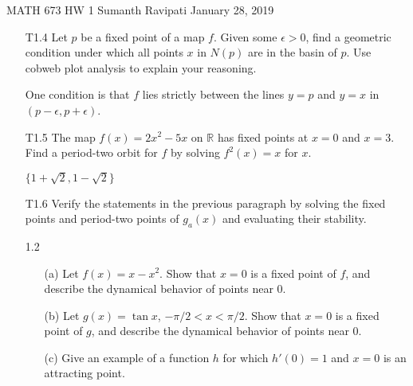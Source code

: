 \documentclass[12pt,letterpaper,reqno]{amsart}
\newcommand{\R}{\mathbb R}
\begin{document}
\thispagestyle{empty}
\begin{center}\large{
    MATH 673\quad
    HW 1\quad
    Sumanth Ravipati\quad
    January 28, 2019}
\end{center}
\vspace{.25in}

\begin{enumerate}
\item[T1.4] Let $p$ be a fixed point of a map $f$. Given some $\epsilon > 0$, find a geometric condition under which all points $x$ in $N(p)$ are in the basin of $p$. Use cobweb plot analysis to explain your reasoning.
\begin{flushleft}
One condition is that $f$ lies strictly between the lines $y = p$ and $y = x$ in $(p - \epsilon,
p + \epsilon)$.
\end{flushleft}

\item [T1.5] The map $f(x) = 2x^2 - 5x$ on $\R$ has fixed points at $x=0$ and $x=3$. Find a period-two orbit for $f$ by solving $f^2(x) = x$ for $x$.
\begin{flushleft}
$ \{1+\sqrt{2}, 1-\sqrt{2}\} $
\end{flushleft}

\item [T1.6] Verify the statements in the previous paragraph by solving the fixed points and period-two points of $g_a(x)$ and evaluating their stability.
\begin{flushleft}

\end{flushleft}

\item [1.2]
\begin{enumerate}
\item[(a)] Let $f(x) = x - x^2$. Show that $x=0$ is a fixed point of $f$, and describe the dynamical behavior of points near $0$.
\begin{flushleft}

\end{flushleft}
\item[(b)] Let $g(x) = \tan x$, $-\pi/2 < x < \pi/2$. Show that $x=0$ is a fixed point of $g$, and describe the dynamical behavior of points near $0$.
\begin{flushleft}

\end{flushleft}
\item[(c)] Give an example of a function $h$ for which $h'(0) = 1$ and $x=0$ is an attracting point.
\begin{flushleft}


\end{flushleft}
\end{enumerate}
\end{enumerate}
\end{document}
